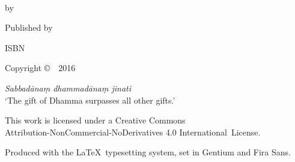 \cleartoverso
\thispagestyle{empty}

{\copyrightsize
\centering
\setlength{\parindent}{0pt}%
\setlength{\parskip}{0.8\baselineskip}%

\thetitle\\
by \theauthor

Published by \thePublisher

ISBN \theISBN

Copyright \copyright\ \thePublisher\ 2016

\vfill

{\footnotesize

\textit{Sabbadānaṃ dhammadānaṃ jinati}\\
‘The gift of Dhamma surpasses all other gifts.’

This work is licensed under a Creative Commons\\
Attribution-NonCommercial-NoDerivatives 4.0 International~License.

Produced with the \LaTeX\ typesetting system, set in Gentium and Fira Sans.

\theEditionInfo

}}
